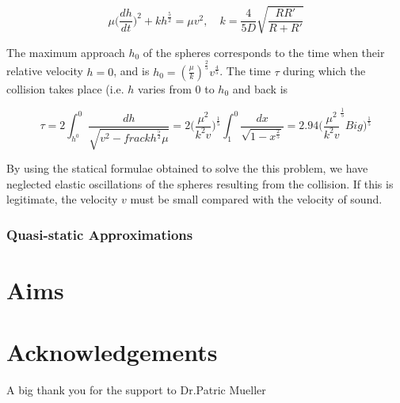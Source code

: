 \begin{equation}
\mu \Big( \frac{dh}{dt} \Big) ^{2} + kh^{\frac{5}{2}} = \mu v^{2}, \quad k=\frac{4}{5D}\sqrt{\frac{RR'}{R+R'}}
\end{equation}


The maximum approach $h_{0}$ of the spheres corresponds to the time when their relative velocity $h = 0$, and is $h_{0} = (\frac{\mu}{k})^{\frac{2}{5}} v^{\frac{4}{5}}$.
The time $\tau$ during which the collision takes place (i.e. $h$ varies from 0 to $h_{0}$ and back is

\begin{equation}
\tau = 2 \int_{h^{0}}^{0} \frac{dh}{\sqrt{v^{2} - frac{kh^{\frac{5}{2}}}{\mu} }} = 2 \Big( \frac{\mu^{2}}{k^{2}v} \Big) ^{\frac{1}{5}} \int_{1}^{0} \frac{dx}{\sqrt{1-x^{\frac{2}{5}}}} = 2.94 \Big( \frac{\mu^{2}}{k^{2}v}^{\frac{1}{5}} Big) ^{\frac{1}{5}}
\end{equation}
 
By using the statical formulae obtained to solve the this problem, we have neglected elastic oscillations of the spheres resulting from the collision. If this is legitimate, the velocity $v$ must be small compared with the velocity of sound.
 
\subsubsection{Quasi-static Approximations}



\section{Aims}


\section{Acknowledgements}

A big thank you for the support to Dr.Patric Mueller

